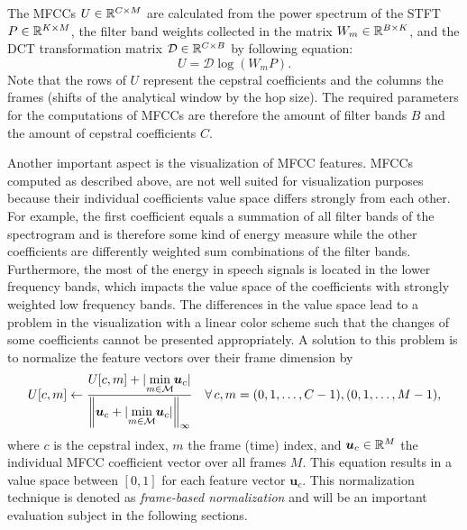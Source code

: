 \FloatBarrier
\noindent
The MFCCs $U \in \mathbb{R}^{C \times M}$ are calculated from the power spectrum of the STFT $P \in \mathbb{R}^{K \times M}$, the filter band weights collected in the matrix $W_m \in \mathbb{R}^{B \times K}$, and the DCT transformation matrix $\mathcal{D} \in \mathbb{R}^{C \times B}$ by following equation:
\begin{equation}\label{eq:signal_mfcc_mfcc}
  U = \mathcal{D} \log{ \left( W_m   P \right) }.
\end{equation}
Note that the rows of $U$ represent the cepstral coefficients and the columns the frames (shifts of the analytical window by the hop size).
The required parameters for the computations of MFCCs are therefore the amount of filter bands $B$ and the amount of cepstral coefficients $C$.

Another important aspect is the visualization of MFCC features.
MFCCs computed as described above, are not well suited for visualization purposes because their individual coefficients value space differs strongly from each other.
For example, the first coefficient equals a summation of all filter bands of the spectrogram and is therefore some kind of energy measure while the other coefficients are differently weighted sum combinations of the filter bands.
Furthermore, the most of the energy in speech signals is located in the lower frequency bands, which impacts the value space of the coefficients with strongly weighted low frequency bands.
The differences in the value space lead to a problem in the visualization with a linear color scheme such that the changes of some coefficients cannot be presented appropriately.
A solution to this problem is to normalize the feature vectors over their frame dimension by
\begin{equation}\label{eq:signal_mfcc_norm}
  U[c, m] \gets \frac{U[c, m] + \vert \underset{m \in \mathcal{M}}{\min} \bm{u}_c \vert}{\norm{\bm{u}_c + \vert \underset{m \in \mathcal{M}}{\min} \bm{u}_c \vert}_\infty} \quad \forall \, c, m = (0, 1, \dots, C - 1), (0, 1, \dots, M - 1),
\end{equation}
where $c$ is the cepstral index, $m$ the frame (time) index, and $\bm{u}_c \in \mathbb{R}^M$ the individual MFCC coefficient vector over all frames $M$.
This equation results in a value space between $[0, 1]$ for each feature vector $\bm{u}_c$.
This normalization technique is denoted as \emph{frame-based normalization} and will be an important evaluation subject in the following sections.

